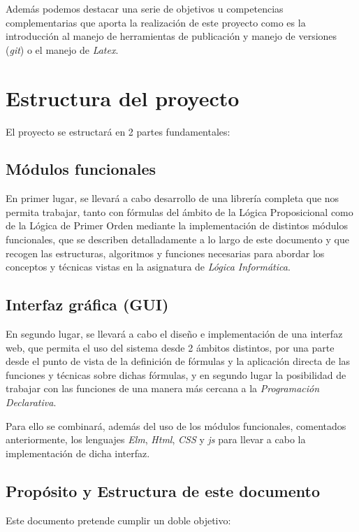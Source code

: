 \documentclass[a4paper]{report}
\begin{document}
Además podemos destacar una serie de objetivos u competencias complementarias que aporta la realización de este proyecto como es la introducción al manejo de herramientas de publicación y manejo de versiones (\textit{git}) o el manejo de \textit{Latex}.


\section{Estructura del proyecto}

El proyecto se estructará en 2 partes fundamentales:

\subsection{Módulos funcionales}

En primer lugar, se llevará a cabo desarrollo de una librería completa que nos permita trabajar, tanto con fórmulas del ámbito de la Lógica Proposicional como de la Lógica de Primer Orden mediante la implementación de distintos módulos funcionales, que se describen detalladamente a lo largo de este documento y que recogen las estructuras, algoritmos y funciones necesarias para abordar los conceptos y técnicas vistas en la asignatura de \textit{Lógica Informática}.

\subsection{Interfaz gráfica (GUI)}

En segundo lugar, se llevará a cabo el diseño e implementación de una interfaz web, que permita el uso del sistema desde 2 ámbitos distintos, por una parte desde el punto de vista de la definición de fórmulas y la aplicación directa de las funciones y técnicas sobre dichas fórmulas, y en segundo lugar la posibilidad de trabajar con las funciones de una manera más cercana a la \textit{Programación Declarativa}.

Para ello se combinará, además del uso de los módulos funcionales, comentados anteriormente, los lenguajes \textit{Elm}, \textit{Html}, \textit{CSS} y \textit{js} para llevar a cabo la implementación de dicha interfaz. 

\subsection{Propósito y Estructura de este documento}

Este documento pretende cumplir un doble objetivo:
\end{document}
